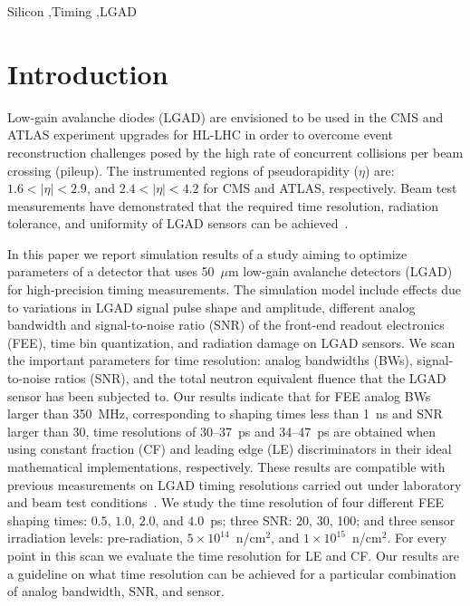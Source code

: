\documentclass[preprint,1p]{elsarticle}
\begin{document}
\begin{frontmatter}
\begin{keyword}

Silicon \sep Timing \sep LGAD

\end{keyword}

\end{frontmatter}

\tableofcontents


\section{Introduction}

Low-gain avalanche diodes (LGAD) are envisioned to be used in the CMS and ATLAS experiment 
upgrades for HL-LHC in order to overcome event reconstruction challenges posed by the high rate of concurrent
collisions per beam crossing (pileup). The instrumented regions of pseudorapidity ($\eta$)
are: $1.6< |\eta| <2.9$, and $2.4< |\eta|<4.2$ for CMS and ATLAS, respectively.
Beam test measurements have demonstrated that the required time resolution,
radiation tolerance, and uniformity of LGAD sensors can be achieved~\cite{Apresyan:2018oln}.

In this paper we report simulation results of a study aiming to optimize 
parameters of a detector that uses 50~$\mu$m low-gain avalanche detectors (LGAD) for
high-precision timing measurements. The simulation model include effects due to variations 
in LGAD signal pulse shape and amplitude, different analog bandwidth and signal-to-noise ratio (SNR) of the front-end readout 
electronics (FEE), time bin quantization, and radiation damage on LGAD sensors.
We scan the important parameters for time resolution: analog bandwidths (BWs),
signal-to-noise ratios (SNR), and the total neutron equivalent fluence that the 
LGAD sensor has been subjected to. Our results indicate that for FEE analog BWs larger than 350~\si{MHz},
corresponding to shaping times less than 1~\si{ns} and SNR larger than 30, time resolutions of 30--37~\si{ps} and 34--47~\si{ps}
are obtained when using constant fraction (CF) and leading edge (LE) discriminators in their ideal mathematical implementations, respectively.
These results are compatible with previous measurements on LGAD timing resolutions carried out under
laboratory and beam test conditions~\cite{Apresyan:2018oln, Cartiglia201783, PELLEGRINI201412}.
We study the time resolution of four different FEE shaping times: $0.5$, $1.0$,
$2.0$, and $4.0$~\si{ps}; three SNR: 20, 30, 100; and three sensor irradiation
levels: pre-radiation, $5\times 10^{14}$~n/cm$^2$, and $1\times 10^{15}$~n/cm$^2$.
For every point in this scan we evaluate the time resolution for LE and CF.
Our results are a guideline on what time resolution can
be achieved for a particular combination of analog bandwidth, SNR, and sensor.
\end{document}
